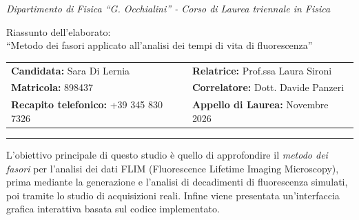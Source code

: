 \documentclass[a4paper, 11pt]{article}
\begin{document}
\vspace{-0pt}
\noindent \textit{\small{Dipartimento di Fisica ``G. Occhialini'' - Corso di Laurea triennale in Fisica}}\\
\vspace{-18pt}
\begin{center}
\normalsize{Riassunto dell'elaborato:}\\
\medskip
\Large{``Metodo dei fasori applicato all'analisi dei tempi di vita di fluorescenza''}
\vspace{0.3cm}
\normalsize

\noindent
\begin{tabular*}{\textwidth}{@{\extracolsep{\fill}}ll@{}}
    \textbf{Candidata:} Sara Di Lernia & \textbf{Relatrice:} Prof.ssa Laura Sironi \\
    \textbf{Matricola:} 898437 & \textbf{Correlatore:} Dott. Davide Panzeri \\
    \textbf{Recapito telefonico:} +39 345 830 7326 & \textbf{Appello di Laurea:} Novembre 2026 \\
\end{tabular*}

\vspace{0.2cm}
\hrule
\vspace{0.4cm}


\normalsize

\end{center}

\vspace{-5pt}

\noindent L'obiettivo principale di questo studio è quello di approfondire il \textit{metodo dei fasori} per l'analisi dei dati FLIM (Fluorescence Lifetime Imaging Microscopy), prima mediante la generazione e l'analisi di decadimenti di fluorescenza simulati, poi tramite lo studio di acquisizioni reali. Infine viene presentata un'interfaccia grafica interattiva basata sul codice implementato.
\end{document}
